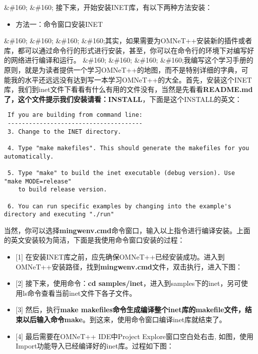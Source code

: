 \&\#160; \&\#160; 接下来，开始安装INET库，有以下两种方法安装：

\begin{itemize}
\item 方法一：命令窗口安装INET

\end{itemize}

\&\#160; \&\#160; \&\#160; \&\#160;其实，如果需要为OMNeT++安装新的插件或者库，都可以通过命令行的形式进行安装，甚至，你可以在命令行的环境下对编写好的网络进行编译和运行。
\&\#160; \&\#160; \&\#160; \&\#160;我编写这个学习手册的原则，就是为读者提供一个学习OMNeT++的地图，而不是特别详细的字典，可能我的水平还远远没有达到写一本学习OMNeT++的大全。首先，安装这个INET库，我们到inet文件下看看有什么有用的文件没有，当然是先看看\textbf{README.md\textbf{了，这个文件提示我们安装请看：}INSTALL}，下面是这个INSTALL的英文：

\begin{verbatim}
 If you are building from command line:
 --------------------------------------
 3. Change to the INET directory.
 
 4. Type "make makefiles". This should generate the makefiles for you automatically.
 
 5. Type "make" to build the inet executable (debug version). Use "make MODE=release"
    to build release version.
 
 6. You can run specific examples by changing into the example's directory and executing "./run"

\end{verbatim}

当然，你可以选择\textbf{mingwenv.cmd}命令窗口，输入以上指令进行编译安装。上面的英文安装较为简洁，下面是我使用命令窗口安装的过程：

\begin{itemize}
\item {[1]} 在安装INET库之前，应先确保OMNeT++已经安装成功。进入到OMNeT++安装路径，找到\textbf{mingwenv.cmd}文件，双击执行，进入下图：

\end{itemize}

\begin{itemize}
\item {[2]} 接下来，使用命令：\textbf{cd samples\slash inet}，进入到samples下的inet，另可使用ls命令查看当前inet文件下各子文件。

\item {[3]} 然后，执行\textbf{make makefiles\textbf{命令生成编译整个inet库的makefile文件，结束以后输入命令}make}。到这来，使用命令窗口编译inet库就结束了。

\item {[4]} 最后需要在OMNeT++ IDE中Project Explore窗口空白处右击, 如图，使用Import功能导入已经编译好的inet库。过程如下图：

\end{itemize}



